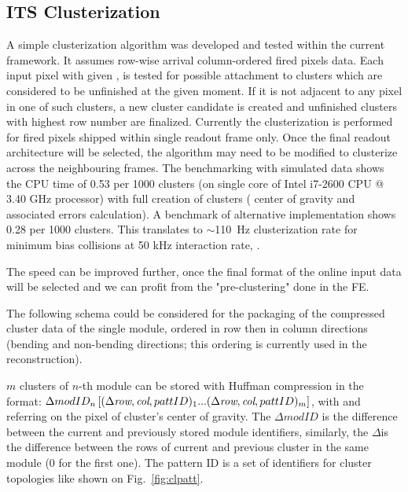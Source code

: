 \subsection{ITS Clusterization}
\label{recoFLP:ITS}

A simple clusterization algorithm was developed and tested within the
current \aliroot framework. It assumes row-wise arrival column-ordered
fired pixels data. Each input pixel with given \row, \col is tested
for possible attachment to clusters which are considered to be 
unfinished at the given moment. If it is not adjacent to any pixel in
one of such clusters, a new cluster candidate is created and
unfinished clusters with highest row number  are finalized. 
Currently the clusterization is performed for fired pixels shipped
within single readout frame only. Once the final readout architecture
will be selected, the algorithm may need to be modified to clusterize
across the neighbouring frames. The benchmarking with simulated data
shows the CPU time of 0.53 \ms per 1000 clusters (on single core of
Intel i7-2600 CPU @ 3.40 GHz processor) with full creation of clusters (
center of gravity and associated errors calculation). A benchmark of
alternative implementation  shows 0.28 \ms per 1000 clusters. 
This translates to $\sim$110~Hz clusterization rate for minimum bias
\pbpb collisions at 50 kHz interaction rate, . 

The speed can be improved further, once the final format of the online input data will
be selected and we can profit from the "pre-clustering" done in the FE.

The following schema could be considered for the packaging of the
compressed cluster data of the single module, ordered in row then in
column directions (bending and non-bending directions; this ordering
is currently used in the reconstruction).

$m$ clusters of $n$-th module can be stored with Huffman compression in the format:
$\Delta modID_{n} \left[ (\Delta \textit{row},\textit{col}, pattID)_{1} ... (\Delta \textit{row},\textit{col}, pattID)_{m} \right]$, with
\row and \col referring on the pixel of cluster's center of gravity.
The $\Delta modID$ is the difference between the current and previously stored module identifiers,
similarly, the $\Delta$\row is the difference between the rows of current and previous cluster in the 
same module (0 for the first one). 
The pattern ID is a set of identifiers for cluster topologies like shown on Fig.~\ref{fig:clpatt}. 

